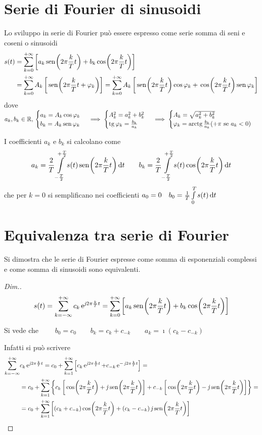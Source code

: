 \section{Serie di Fourier di sinusoidi}
Lo sviluppo in serie di Fourier può essere espresso come serie somma di seni e coseni o sinusoidi
\[\begin{split} s(t)&=\sum_{k=0}^{+\infty}\left[ a_k \,{\operatorname{sen}}^{}\!\left({2\pi\frac{k}{T}t}\right) + b_k \,{\operatorname{cos}}^{}\!\left({2\pi\frac{k}{T}t}\right)\right] \\
&=\sum_{k=0}^{+\infty}A_k\left[\,{\operatorname{sen}}^{}\!\left({2\pi\frac{k}{T}t+\varphi_k}\right)\right] =\sum_{k=0}^{+\infty}A_k\left[\,{\operatorname{sen}}^{}\!\left({2\pi\frac{k}{T}t}\right)\operatorname{cos}\varphi_k +\,{\operatorname{cos}}^{}\!\left({2\pi\frac{k}{T}t}\right)\operatorname{sen}\varphi_k \right]
\end{split}\]
dove $a_k,b_k \in\mathbb{R},\,\begin{cases}a_k=A_k\operatorname{cos}\varphi_k \\b_k=A_k\operatorname{sen}\varphi_k \end{cases}\implies\begin{cases}A_k^2=a_k^2+b_k^2\\ \operatorname{tg}\varphi_k=\frac{b_k}{a_k} \end{cases}\implies\begin{cases}A_k=\sqrt{a_k^2+b_k^2}\\ \varphi_k=\operatorname{arctg}\frac{b_k}{a_k} (+\pi\text{ se }a_k<0) \end{cases}$

I coefficienti $a_k$ e $b_k$ si calcolano come
\[a_k=\frac{2}{T}\int\limits_{-\frac{T}{2}}^{+\frac{T}{2}}{s(t)\,{\operatorname{sen}}^{}\!\left({2\pi\frac{k}{T}t}\right)}{\,\mathop{}\!\mathrm{d}{t}} \qquad b_k=\frac{2}{T}\int\limits_{-\frac{T}{2}}^{+\frac{T}{2}}{s(t)\,{\operatorname{cos}}^{}\!\left({2\pi\frac{k}{T}t}\right)}{\,\mathop{}\!\mathrm{d}{t}}\]
che per $k=0$ si semplificano nei coefficienti $a_0=0 \quad b_0=\frac{1}{T}\int\limits_{0}^{T}{s(t)}{\,\mathop{}\!\mathrm{d}{t}}$

\section{Equivalenza tra serie di Fourier}
Si dimostra che le serie di Fourier espresse come somma di esponenziali complessi e come somma di sinusoidi sono equivalenti.

\begin{proof}[Dim.]
\[s(t)=\sum_{k=-\infty}^{+\infty} c_k \operatorname{e}^{\operatorname{\mathit{j}\!} 2\pi\frac{k}{T}t} = \sum_{k=0}^{+\infty}\left[ a_k \,{\operatorname{sen}}^{}\!\left({2\pi\frac{k}{T}t}\right) + b_k \,{\operatorname{cos}}^{}\!\left({2\pi\frac{k}{T}t}\right)\right]
\]

Si vede che $\qquad b_0=c_0 \qquad b_k=c_k+c_{-k} \qquad a_k=\imath (c_k-c_{-k})$

Infatti si può scrivere
\[\begin{split}\sum_{k=-\infty}^{+\infty} & c_k \e{\imath 2\pi\frac{k}{T}t} = c_0+ \sum_{k=1}^{+\infty} \left[ c_k \e{\imath 2\pi\frac{k}{T}t} + c_{-k} \e{-\imath 2\pi\frac{k}{T}t} \right] = \\
&= c_0 + \sum_{k=1}^{+\infty} {\left\lbrace c_k \left[\cos{2\pi\frac{k}{T}t}+\imath\sen{2\pi\frac{k}{T}t}\right]
+c_{-k}\left[\cos{2\pi\frac{k}{T}t}-\imath\sen{2\pi\frac{k}{T}t}\right] \right\rbrace}=\\
&= c_0 + \sum_{k=1}^{+\infty} {\left[(c_k+c_{-k}) \cos{2\pi\frac{k}{T}t}+
(c_k-c_{-k})\imath\sen{2\pi\frac{k}{T}t}\right] }\end{split}\]
\end{proof}

